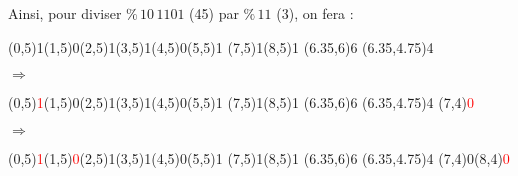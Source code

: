 \documentclass[11pt,a4paper]{article}
\begin{document}
\medskip

Ainsi, pour diviser \og $ \% \, 10 \, 1101 $ \fg{} (45) par \og $ \% \, 11 $ \fg{} (3), on fera :

\begin{center}

\begin{table}[ht!]
  \centering
  \begin{minipage}{0.15\textwidth}

\par\vspace{6\oplineheight}
\oplput(0,5){1}\oplput(1,5){0}\oplput(2,5){1}\oplput(3,5){1}\oplput(4,5){0}\oplput(5,5){1}
\oplput(7,5){1}\oplput(8,5){1}
\opvline(6.35,6){6}
\ophline(6.35,4.75){4}

  \end{minipage}
  \hfillx
  \begin{minipage}{0.1\textwidth}
    \centering

$ \Rightarrow $

  \end{minipage}
  \hfillx
  \begin{minipage}{0.15\textwidth}

\par\vspace{6\oplineheight}
\oplput(0,5){\textcolor{red}{1}}\oplput(1,5){0}\oplput(2,5){1}\oplput(3,5){1}\oplput(4,5){0}\oplput(5,5){1}
\oplput(7,5){1}\oplput(8,5){1}
\opvline(6.35,6){6}
\ophline(6.35,4.75){4}
\oplput(7,4){\textcolor{red}{0}}

  \end{minipage}
  \hfillx
  \begin{minipage}{0.1\textwidth}
    \centering

$ \Rightarrow $

  \end{minipage}
  \hfillx
  \begin{minipage}{0.15\textwidth}

\par\vspace{6\oplineheight}
\oplput(0,5){\textcolor{red}{1}}\oplput(1,5){\textcolor{red}{0}}\oplput(2,5){1}\oplput(3,5){1}\oplput(4,5){0}\oplput(5,5){1}
\oplput(7,5){1}\oplput(8,5){1}
\opvline(6.35,6){6}
\ophline(6.35,4.75){4}
\oplput(7,4){0}\oplput(8,4){\textcolor{red}{0}}

  \end{minipage}
  \hfillx
  \begin{minipage}{0.1\textwidth}
    \centering


\end{minipage}
\end{table}
\end{center}
\end{document}
